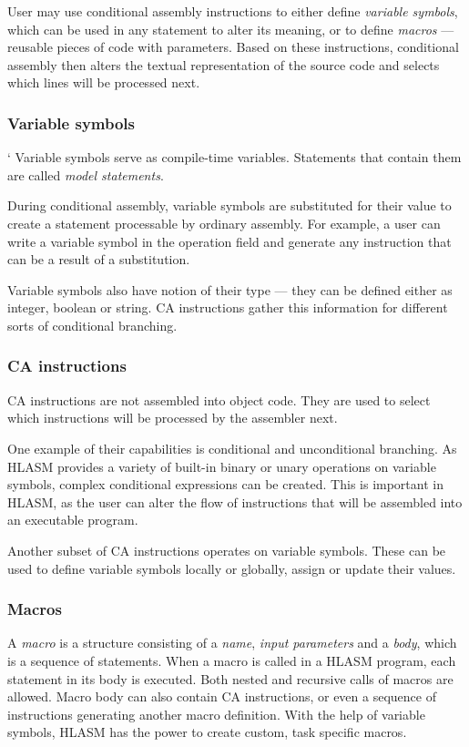 User may use conditional assembly instructions to either define \emph{variable symbols}, which can be used in any statement to alter its meaning, or to define \emph{macros} --- reusable pieces of code with parameters. Based on these instructions, conditional assembly then alters the textual representation of the source code and selects which lines will be processed next.

\subsubsection{Variable symbols}
\label{var_sym}`
Variable symbols serve as compile-time variables. Statements that contain them are called \emph{model statements}.

During conditional assembly, variable symbols are substituted for their value to create a statement processable by ordinary assembly. For example, a user can write a variable symbol in the operation field and generate any instruction that can be a result of a substitution.

Variable symbols also have notion of their type --- they can be defined either as integer, boolean or string. CA instructions gather this information for different sorts of conditional branching.

\subsubsection{CA instructions}
\label{ca_instr}

CA instructions are not assembled into object code. They are used to select which instructions will be processed by the assembler next.

One example of their capabilities is conditional and unconditional branching. As HLASM provides a variety of built-in binary or unary operations on variable symbols, complex conditional expressions can be created. This is important in HLASM, as the user can alter the flow of instructions that will be assembled into an executable program.

Another subset of CA instructions operates on variable symbols. These can be used to define variable symbols locally or globally, assign or update their values.

\subsubsection{Macros}

A \emph{macro} is a structure consisting of a \emph{name}, \emph{input parameters} and a \emph{body}, which is a sequence of statements. When a macro is called in a HLASM program, each statement in its body is executed. Both nested and recursive calls of macros are allowed. Macro body can also contain CA instructions, or even a sequence of instructions generating another macro definition. With the help of variable symbols, HLASM has the power to create custom, task specific macros.


